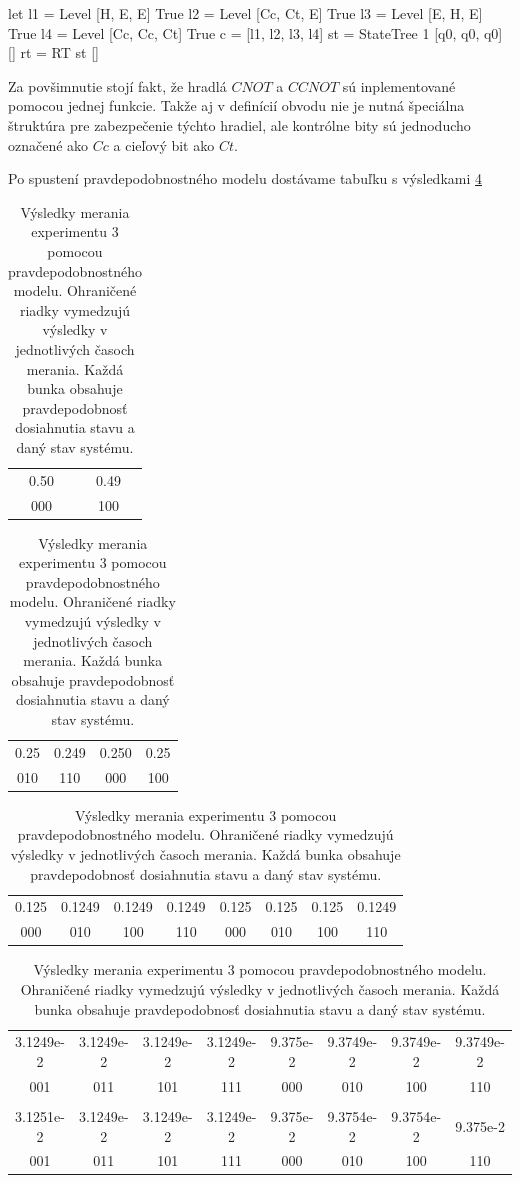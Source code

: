\begin{code}
let l1 = Level [H, E, E] True
    l2 = Level [Cc, Ct, E] True
    l3 = Level [E, H, E] True
    l4 = Level [Cc, Cc, Ct] True
    c = [l1, l2, l3, l4]
    st = StateTree 1 [q0, q0, q0] []
    rt = RT st []
\end{code}

Za povšimnutie stojí fakt, že hradlá \(CNOT\) a \(CCNOT\) sú inplementované
pomocou jednej funkcie. Takže aj v definícií obvodu nie je nutná špeciálna 
štruktúra pre zabezpečenie týchto hradiel, ale kontrólne bity sú jednoducho
označené ako \(Cc\) a cieľový bit ako \(Ct\).

Po spustení pravdepodobnostného modelu dostávame tabuľku s výsledkami 
\ref{expr3_results}

\begin{table}
\centering

\begin{tabular}{|c|c|}
\hline
0.50 & 0.49 \\ 
000 & 100 \\ 
\hline
\end{tabular}

\begin{tabular}{|c|c|c|c|}
\hline
0.25 & 0.249 & 0.250 & 0.25 \\ 
010 & 110 & 000 & 100 \\ 
\hline
\end{tabular}

\begin{tabular}{|c|c|c|c|c|c|c|c|}
\hline
0.125 & 0.1249 & 0.1249 & 0.1249 & 0.125 & 0.125 & 0.125 & 0.1249 \\ 
000 & 010 & 100 & 110 & 000 & 010 & 100 & 110 \\ 
\hline
\end{tabular}

\begin{tabular}{|c|c|c|c|c|c|c|c|}
\hline
3.1249e-2 & 3.1249e-2 & 3.1249e-2 & 3.1249e-2 & 9.375e-2 & 9.3749e-2 & 9.3749e-2 & 9.3749e-2  \\ 
001 & 011 & 101 & 111 & 000 & 010 & 100 & 110  \\ 

& & & & & & & \\

3.1251e-2 & 3.1249e-2 & 3.1249e-2 & 3.1249e-2 & 9.375e-2 & 9.3754e-2 & 9.3754e-2 & 9.375e-2 \\
001 & 011 & 101 & 111 & 000 & 010 & 100 & 110 \\
\hline
\end{tabular}

\caption{\label{expr3_results} Výsledky merania experimentu 3 pomocou
pravdepodobnostného modelu. Ohraničené riadky vymedzujú výsledky v jednotlivých
 časoch merania. Každá bunka obsahuje pravdepodobnosť dosiahnutia stavu a 
daný stav systému.}
\end{table}

